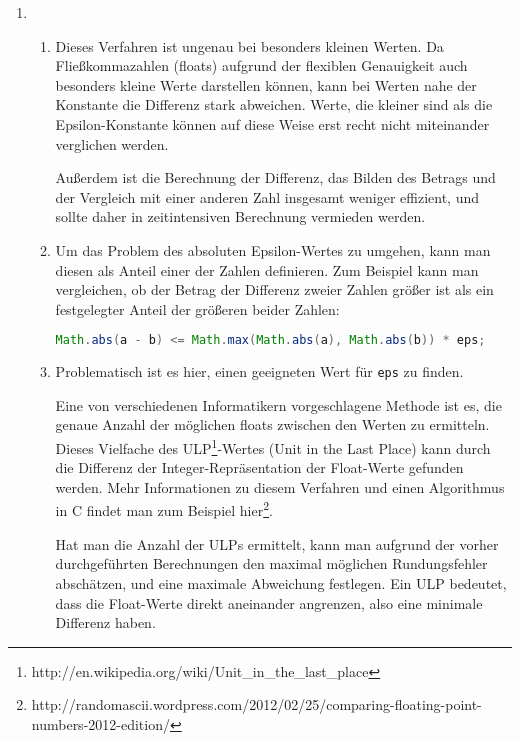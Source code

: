 \documentclass[a4paper,10pt]{scrartcl}
\begin{document}
\begin{enumerate}
    \item[\textbf{1.}]
        \begin{enumerate}
            \item[a)]
                Dieses Verfahren ist ungenau bei besonders kleinen Werten. Da Fließkommazahlen (floats)
                aufgrund der flexiblen Genauigkeit auch besonders kleine Werte darstellen können, kann
                bei Werten nahe der Konstante die Differenz stark abweichen. Werte, die kleiner sind als
                die Epsilon-Konstante können auf diese Weise erst recht nicht miteinander verglichen werden.

                Außerdem ist die Berechnung der Differenz, das Bilden des Betrags und der Vergleich mit einer
                anderen Zahl insgesamt weniger effizient, und sollte daher in zeitintensiven Berechnung vermieden werden.

            \item[b)]
                Um das Problem des absoluten Epsilon-Wertes zu umgehen, kann man diesen als Anteil einer der Zahlen
                definieren. Zum Beispiel kann man vergleichen, ob der Betrag der Differenz zweier Zahlen
                größer ist als ein festgelegter Anteil der größeren beider Zahlen:

\begin{lstlisting}[language=java]
    Math.abs(a - b) <= Math.max(Math.abs(a), Math.abs(b)) * eps;
\end{lstlisting}

            \item[c)]
                Problematisch ist es hier, einen geeigneten Wert für \lstinline|eps| zu finden.

                Eine von verschiedenen Informatikern vorgeschlagene Methode ist es, die genaue
                Anzahl der möglichen floats zwischen den Werten zu ermitteln. Dieses Vielfache
                des ULP\footnote{http://en.wikipedia.org/wiki/Unit\_in\_the\_last\_place}-Wertes (Unit in the Last Place)
                kann durch die Differenz der Integer-Repräsentation der Float-Werte gefunden
                werden. Mehr Informationen zu diesem Verfahren und einen Algorithmus in C
                findet man zum Beispiel hier\footnote{http://randomascii.wordpress.com/2012/02/25/comparing-floating-point-numbers-2012-edition/}.

                Hat man die Anzahl der ULPs ermittelt, kann man aufgrund der vorher durchgeführten Berechnungen
                den maximal möglichen Rundungsfehler abschätzen, und eine maximale Abweichung festlegen. Ein ULP
                bedeutet, dass die Float-Werte direkt aneinander angrenzen, also eine minimale Differenz haben.
        \end{enumerate}


\end{enumerate}
\end{document}
